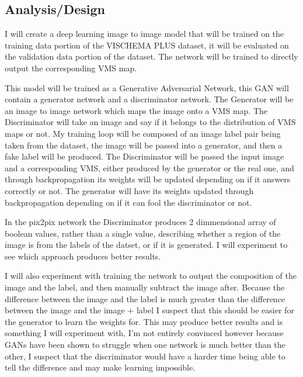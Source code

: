 \documentclass[11pt]{article}
\begin{document}
\subsection{Analysis/Design}


I will create a deep learning image to image model that will be trained on the training data portion of the VISCHEMA PLUS dataset, it will be evaluated on the validation data portion of the dataset. The network will be trained to directly output the corresponding VMS map.

This model will be trained as a Generative Adversarial Network, this GAN will contain a generator network and a discriminator network. The Generator will be an image to image network which maps the image onto a VMS map. The Discriminator will take an image and say if it belongs to the distribution of VMS maps or not. My training loop will be composed of an image label pair being taken from the dataset, the image will be passed into a generator, and then a fake label will be produced. The Discriminator will be passed the input image and a corresponding VMS, either produced by the generator or the real one, and through backpropagation its weights will be updated depending on if it answers correctly or not. The generator will have its weights updated through backpropagation depending on if it can fool the discriminator or not. 

In the pix2pix network the Discriminator produces 2 dimmensional array of boolean values, rather than a single value, describing whether a region of the image is from the labels of the datset, or if it is generated. I will experiment to see which approach produces better results. 


I will also experiment with training the network to output the composition of the image and the label, and then manually subtract the image after. Because the difference between the image and the label is much greater than the difference between the image and the image + label I suspect that this should be easier for the generator to learn the weights for. This may produce better results and is something I will experiment with, I'm not entirely convinced however because GANs have been shown to struggle when one network is much better than the other, I suspect that the discriminator would have a harder time being able to tell the difference and may make learning impossible. 
\end{document}
